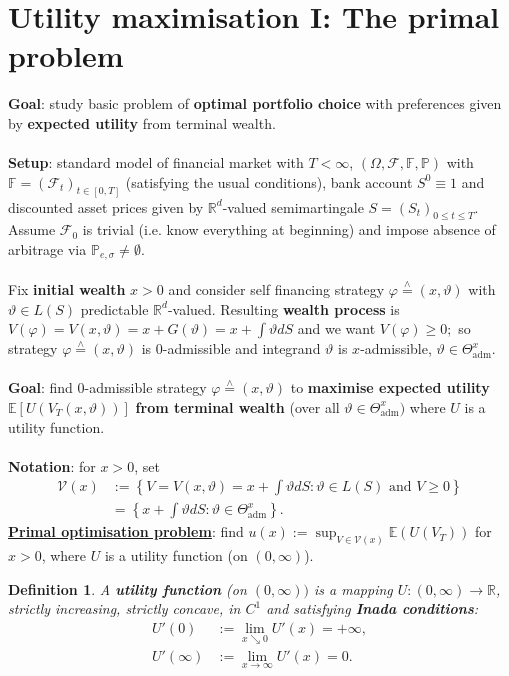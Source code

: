 \documentclass[12pt,a4paper, twoside]{article}
\newtheorem{defn}{Definition}[section]
\theoremstyle{definition}
\newcommand{\EE}{\mathbb{E}} %
\newcommand{\PP}{\mathbb{P}} %
\newcommand{\teq}{\overset{\wedge}{=}}
\begin{document}
\section{Utility maximisation I: The primal problem}
\textbf{Goal}: study basic problem of \textbf{optimal portfolio choice} with preferences given by \textbf{expected utility} from terminal wealth.\\
\\
\textbf{Setup}: standard model of financial market with $T < \infty$, $( \Omega, \mathcal{F}, \mathbb{F}, \PP)$ with $\mathbb{F}=(\mathcal{F}_t)_{t \in [0,T]}$ (satisfying the usual conditions), bank account $S^0 \equiv 1$ and discounted asset prices given by $\mathbb{R}^d$-valued semimartingale $S=(S_t)_{0 \leq t \leq T}$. Assume $\mathcal{F}_0$ is trivial (i.e. know everything at beginning) and impose absence of arbitrage via $\PP_{e, \sigma} \neq \emptyset$. \\
\\
Fix \textbf{initial wealth} $x>0$ and consider self financing strategy $\varphi \teq (x, \vartheta)$ with $\vartheta \in L(S)$ predictable $\mathbb{R}^d$-valued. Resulting \textbf{wealth process} is $V( \varphi)= V(x, \vartheta)= x + G( \vartheta) = x + \int \vartheta dS$ and we want $V( \varphi) \geq 0;$ so strategy $\varphi \teq (x, \vartheta)$ is $0$-admissible and integrand $\vartheta$ is $x$-admissible, $\vartheta \in \Theta_\text{adm}^x$. 
\\\\
\textbf{Goal}: find $0$-admissible strategy $\varphi \teq (x, \vartheta)$ to \textbf{maximise expected utility} $\EE[U(V_T( x, \vartheta))]$ \textbf{from terminal wealth} (over all $\vartheta \in \Theta_\text{adm}^x)$ where $U$ is a  utility function.  
\\\\
\textbf{Notation}: for $x>0$, set 
\begin{align*}
\mathcal{V}(x)&:= \left\{ V= V(x, \vartheta) = x + \int \vartheta dS : \vartheta \in L(S) \text{ and } V \geq 0 \right\} \\
& = \left\{ x + \int \vartheta dS : \vartheta \in \Theta_\text{adm}^x \right\}.
\end{align*}
\underline{\textbf{Primal optimisation problem}}: find $u(x):= \sup_{V \in \mathcal{V}(x)} \EE( U(V_T))$ for $x >0$, where $U$ is a utility function (on $(0, \infty)$). 
\begin{defn} A \textbf{utility function} (on $(0, \infty))$ is a mapping $U: (0, \infty) \to \mathbb{R}$, strictly increasing, strictly concave, in $C^1$ and satisfying \textbf{Inada conditions}:
\begin{align*}
U'(0)&:= \lim_{x \searrow 0} U'(x)= + \infty, \\
U'( \infty)&:= \lim_{x \to \infty} U'(x) = 0.
\end{align*}
\end{defn}
\end{document}
